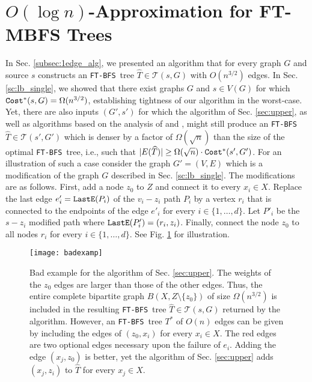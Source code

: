 \documentclass[12pt]{article}
\def\Cost{\mbox{\tt Cost}}
\def\LastE{\mbox{\tt LastE}}
\def\FTBFS{\mbox{\tt FT-BFS}}
\begin{document}
\section{$O(\log n)$-Approximation for FT-MBFS Trees}
\label{sec:approx}
In Sec. \ref{subsec:1edge_alg}, we presented an algorithm that for every graph $G$ and source $s$ constructs an \FTBFS\ tree
$\widehat{T} \in \mathcal{T}(s,G)$ with $O(n^{3/2})$ edges.
In Sec. \ref{sc:lb_single},
we showed that there exist graphs $G$ and $s \in V(G)$ for which $\Cost^*(s, G)=\Omega(n^{3/2})$, establishing tightness of our algorithm in the worst-case.
Yet, there are also inputs $(G',s')$ for which the algorithm of Sec. \ref{sec:upper}, as well as algorithms based on the analysis of \cite{GW12} and \cite{RTREP05}, might still produce an \FTBFS\
$\widehat{T} \in \mathcal{T}(s',G')$ which is denser by a factor of
$\Omega(\sqrt{n})$ than the size of the optimal \FTBFS\ tree, i.e., such that $|E(\widehat{T})|\geq \Omega(\sqrt{n}) \cdot \Cost^*(s', G')$.
For an illustration of such a case consider the graph $G'=(V,E)$ which is a modification of the graph $G$ described in
Sec. \ref{sc:lb_single}.
The modifications are as follows.
First, add a node $z_0$ to $Z$ and connect it to every $x_i \in X$.
Replace the last edge $e'_i=\LastE(P_i)$ of the $v_i-z_i$ path $P_i$ by a
vertex $r_i$ that is connected to the endpoints of the edge $e'_i$
for every $i \in \{1, \ldots, d\}$.
Let $P'_i$ be the $s-z_i$ modified path where $\LastE(P'_i)=(r_i,z_i)$.
Finally, connect the node $z_0$ to all nodes $r_i$ for every $i \in \{1, \ldots, d\}$.
See Fig. \ref{fig:badexamp} for illustration.

\begin{figure}[h!]
\begin{center}
\texttt{[image: badexamp]}
\caption{Bad example for the algorithm of Sec. \ref{sec:upper}.
The weights of the $z_0$ edges are larger than those of the other edges. Thus, the entire complete bipartite graph $B(X,Z \setminus \{z_0\})$ of
size $\Omega(n^{3/2})$ is included in the resulting \FTBFS\ tree
$\widehat{T} \in \mathcal{T}(s,G)$ returned by the algorithm.
However, an \FTBFS\ tree $T^*$ of $O(n)$ edges
can be given by including the edges of $(z_0,x_i)$ for every $x_i \in X$.
The red edges are two optional edges necessary upon the failure of $e_i$. Adding the edge $(x_j,z_0)$ is better, yet the algorithm of Sec. \ref{sec:upper} adds $(x_j,z_i)$ to $\widehat{T}$ for every $x_j \in X$.
\label{fig:badexamp}}
\end{center}
\end{figure}
\end{document}

